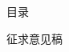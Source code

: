 \documentclass[zihao=-4,heading=true,a4paper,twoside,openany]{ctexart}
\begin{document}




目\quad 录


征求意见稿
\end{document}
